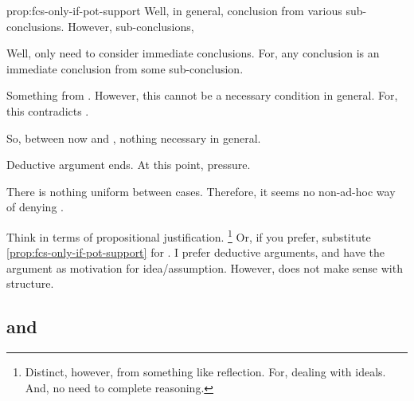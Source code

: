 \begin{note}
\begin{argument}{prop:fcs-only-if-pot-support}
    Well, in general, conclusion from various sub-conclusions.
    However, sub-conclusions,

    Well, only need to consider immediate conclusions.
    For, any conclusion is an immediate conclusion from some sub-conclusion.

    \smallskip
    Something from \pevent{}.
    However, this cannot be a necessary condition in general.
    For, this contradicts \supportII{}.

    So, between now and \pevent{}, nothing necessary in general.

    \smallskip
    Deductive argument ends.
    At this point, pressure.

    There is nothing uniform between cases.
    Therefore, it seems no non-ad-hoc way of denying \ros{}.
  \end{argument}

  Think in terms of propositional justification.%
  \footnote{
    Distinct, however, from something like reflection.
    For, dealing with ideals.
    And, no need to complete reasoning.
  }
  Or, if you prefer, substitute \autoref{prop:fcs-only-if-pot-support} for \supportII{}.
  I prefer deductive arguments, and have the argument as motivation for idea/assumption.
  However, does not make sense with structure.
\end{note}

\subsection{ and \issueConstraint{}}


